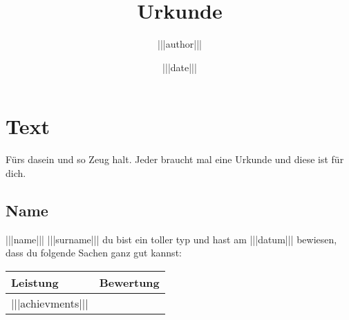 \documentclass[a4paper]{article}
\title{Urkunde}
\author{|||author|||}
\date{|||date|||}
\begin{document}
\maketitle
\section{Text}

Fürs dasein und so Zeug halt. Jeder braucht mal eine Urkunde und diese ist für dich.

\subsection{Name}

|||name||| |||surname||| du bist ein toller typ und hast am |||datum||| bewiesen, dass du folgende Sachen ganz gut kannst:

  \begin{tabular}{ l | c }
    \hline
    Leistung & Bewertung \\ \hline
    |||achievments|||
  \end{tabular}
\end{document}
